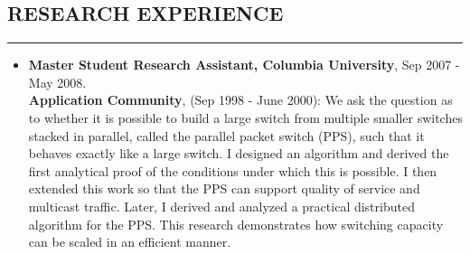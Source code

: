 \documentclass[10pt,a4]{article}
\begin{document}
\begin{small}
\subsection*{RESEARCH EXPERIENCE}
\hrule
\vspace{0.2cm}
\begin{itemize}
\item {\bf Master Student Research Assistant, Columbia University}, Sep 2007 - May 2008. \\
%
  {\bf Application Community}, (Sep 1998 - June 2000): We ask the question as to
  whether it is possible to build a large switch from multiple smaller switches
  stacked in parallel, called the parallel packet switch (PPS), such that it
  behaves exactly like a large switch. I designed an algorithm and derived the
  first analytical proof of the conditions under which this is possible. I then
  extended this work so that the PPS can support quality of service and
  multicast traffic. Later, I derived and analyzed a practical distributed
  algorithm for the PPS. This research demonstrates how switching capacity can
  be scaled in an efficient manner.


\end{itemize}
\end{small}
\end{document}
